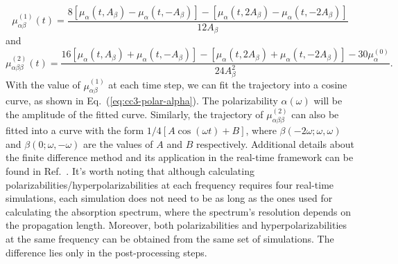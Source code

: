 \begin{equation}
\mu_{\alpha \beta}^{(1)}(t)=\frac{8[\mu_{\alpha}(t,A_{\beta})-\mu_{\alpha}(t,-A_{\beta})]-[\mu_{\alpha}(t,2A_{\beta})-\mu_{\alpha}(t,-2A_{\beta})]}{12A_{\beta}}
\end{equation}
and 
\begin{equation}
\mu_{\alpha \beta\beta}^{(2)}(t)=\frac{16[\mu_{\alpha}(t,A_{\beta})+\mu_{\alpha}(t,-A_{\beta})]-[\mu_{\alpha}(t,2A_{\beta})+\mu_{\alpha}(t,-2A_{\beta})]-30\mu^{(0)}_{\alpha}}{24A_{\beta}^2}.
\end{equation}
With the value of $\mu_{\alpha \beta}^{(1)}$ at each time step, we can fit the trajectory into a cosine curve, as shown in Eq.~(\ref{eq:cc3-polar-alpha}). The polarizability $\alpha(\omega)$ will be the amplitude of the fitted curve. Similarly, the trajectory of $\mu_{\alpha \beta\beta}^{(2)}$ can also be fitted into a curve with the form $1/4[A\cos(\omega t) + B]$, where $\beta(-2\omega;\omega,\omega)$ and $\beta(0;\omega,-\omega)$ are the values of $A$ and $B$ respectively. Additional details about the finite difference method and its application in the real-time framework can be found in Ref.~. It's worth noting that although calculating polarizabilities/hyperpolarizabilities at each frequency requires four real-time simulations, each simulation does not need to be as long as the ones used for calculating the absorption spectrum, where the spectrum's resolution depends on the propagation length. Moreover, both polarizabilities and hyperpolarizabilities at the same frequency can be obtained from the same set of simulations. The difference lies only in the post-processing steps.

